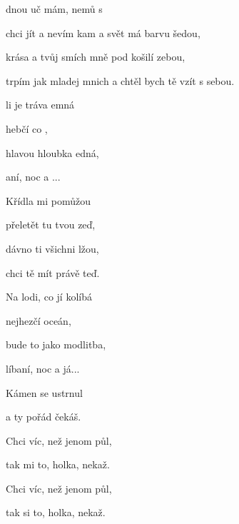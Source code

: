 

\zs
{}dnou uč mám,  nemů s 

chci jít a nevím kam a svět má barvu šedou,

krása a tvůj smích mně pod košilí zebou,

trpím jak mladej mnich a chtěl bych tě vzít s sebou.
\ks

\zr
{}li je tráva emná

hebčí co ,

 hlavou hloubka edná,

aní, noc a ...
\kr

\zs
Křídla mi pomůžou

přeletět tu tvou zeď,

dávno ti všichni lžou,

chci tě mít právě teď.

\ks

\zr
Na lodi, co jí kolíbá

nejhezčí oceán,

bude to jako modlitba,

líbaní, noc a já...
\kr

\zs
Kámen se ustrnul

a ty pořád čekáš.

Chci víc, než jenom půl,

tak mi to, holka, nekaž.

Chci víc, než jenom půl,

tak si to, holka, nekaž.

\ks

\kp
